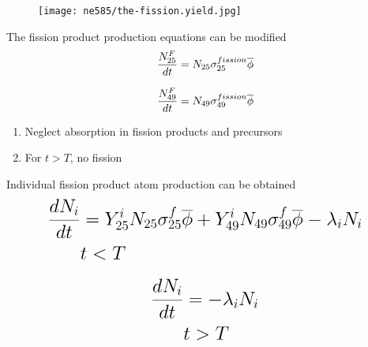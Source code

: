 \documentclass[aspectratio=1610,pdftex,dvipsnames,compress,xcolor={dvipsnames}]{beamer}
\begin{document}
\begin{frame}{}
    \begin{figure}
        \centering
        \texttt{[image: ne585/the-fission.yield.jpg]}
    \end{figure}
\end{frame}


\begin{frame}{The fission product production equations can be modified}
    \begin{equation}
        \LARGE
        \frac{N_{25}^F}{dt}=N_{25} \sigma_{25}^{fission} \overline{\phi}
    \end{equation}
    
    \begin{equation}
        \LARGE
        \frac{N_{49}^F}{dt}=N_{49} \sigma_{49}^{fission} \overline{\phi}
    \end{equation}
    
    \vspace*{\fill}

    \begin{enumerate}[series=outerlist,topsep=0pt,itemsep=21pt,leftmargin=*,label=(\arabic*)]
        \item[]Neglect absorption in fission products and precursors
        \item[]For $t > T$, no fission
    \end{enumerate}
\end{frame}


\begin{frame}{Individual fission product atom production can be obtained}
    \begin{equation}
        \LARGE
        \begin{aligned}
            \frac{dN_i}{dt} & = Y_{25}^i N_{25}\sigma_{25}^f\overline{\phi} + Y_{49}^i N_{49}\sigma_{49}^f\overline{\phi}-\lambda_iN_i
            \\
            & t < T
        \end{aligned}
    \end{equation}
    
    \begin{equation}
        \LARGE
        \begin{aligned}
            \frac{dN_i}{dt} & = -\lambda_iN_i
            \\
            & t > T
        \end{aligned}
    \end{equation}
\end{frame}
\end{document}
